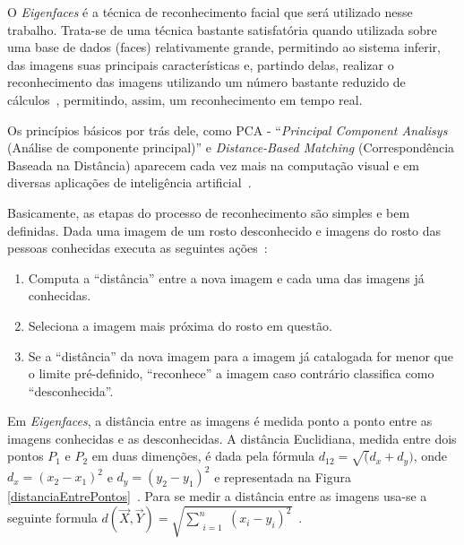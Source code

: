 O \textit{Eigenfaces}	é a técnica de reconhecimento facial que será utilizado nesse trabalho. Trata-se de uma técnica bastante satisfatória quando utilizada sobre uma base de dados (faces) relativamente grande, permitindo ao sistema inferir, das imagens suas principais características e, partindo delas, realizar o reconhecimento das imagens utilizando um número bastante reduzido de cálculos~\cite{artigo-eigenface}, permitindo, assim, um reconhecimento em tempo real.	

Os princípios básicos por trás dele, como PCA - ``\textit{Principal Component Analisys} (Análise de componente principal)'' e \textit{Distance-Based Matching} (Correspondência Baseada na Distância) aparecem cada vez mais na computação visual e em diversas aplicações de inteligência artificial~\cite{hewitt}.

Basicamente, as etapas do processo de reconhecimento são simples e bem definidas. Dada uma imagem de um rosto desconhecido e imagens do rosto das pessoas conhecidas executa as seguintes ações~\cite{hewitt}:

	\begin{enumerate}
		\item Computa a ``distância'' entre a nova imagem e cada uma das imagens já conhecidas.
		\item Seleciona a imagem mais próxima	 do rosto em questão.
		\item Se a ``distância'' da nova imagem para a imagem já catalogada for menor que o limite pré-definido, ``reconhece'' a imagem caso contrário classifica como ``desconhecida''.
	\end{enumerate}

Em \textit{Eigenfaces}, a distância entre as imagens é medida ponto a ponto entre as imagens conhecidas e as desconhecidas. A distância Euclidiana, medida entre dois pontos $P_1$ e $P_2$ em duas dimenções, é dada pela fórmula $\displaystyle d_{12} = \sqrt(d_{x} + d_{y})$, onde $\displaystyle d_x = (x_2 - x_1)^2$ e $\displaystyle d_y = (y_2-y_1)^2$ e representada na Figura \ref{distanciaEntrePontos}~\cite{hewitt}. Para se medir a distância entre as imagens usa-se a seguinte formula $\displaystyle d(\vec{X}, \vec{Y}) = \sqrt{\sum_{\substack{i=1}}^{n} (x_i-y_i)^2}$~\cite{perlibakas}.

